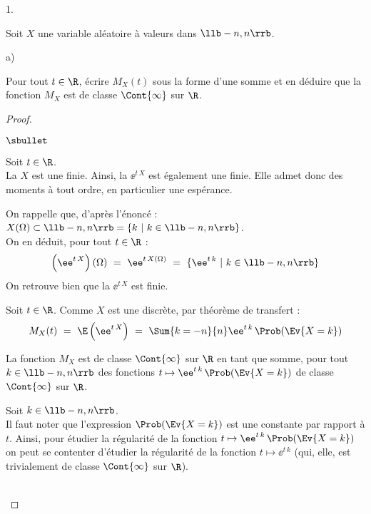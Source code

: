 \documentclass[11pt]{article}%
\begin{document}


\begin{noliste}{1.}
  \setlength{\itemsep}{4mm}
\item Soit $X$ une variable aléatoire à valeurs dans $\llb -n, n\rrb$.
  \begin{noliste}{a)}
    \setlength{\itemsep}{2mm}
  \item Pour tout $t\in \R$, écrire $M_X(t)$ sous la forme d'une somme
    et en déduire que la fonction $M_X$ est de classe $\Cont{\infty}$
    sur $\R$.
    \begin{proof}~
      \begin{noliste}{$\sbullet$}
      \item Soit $t \in \R$.\\
        La \var $X$ est une \var finie. Ainsi, la \var $\ee^{t \,
          X}$ est également une \var finie. Elle admet donc des
        moments à tout ordre, en particulier une espérance.
        \begin{remark}
          On rappelle que, d'après l'énoncé : $X(\Omega) \subset \llb
          -n, n \rrb = \{k \ | \ k \in \llb -n, n \rrb\}$.\\
          On en déduit, pour tout $t \in \R$ :
          \[
            \left(\ee^{t \, X}\right)(\Omega) \ = \ \ee^{t \,
              X(\Omega)} \ = \ \{\ee^{t \, k} \ | \ k \in \llb -n, n
            \rrb \}
          \]
          On retrouve bien que la \var $\ee^{t \, X}$ est finie.
        \end{remark}
        
      \item Soit $t\in \R$. Comme $X$ est une \var discrète, par
        théorème de transfert :
        \[
          M_X(t) \ = \ \E\left(\ee^{t \, X}\right) \ = \ \Sum{k=-n}{n}
          \ee^{t \, k} \, \Prob(\Ev{X = k})
        \]
        
      \item La fonction $M_X$ est de classe $\Cont{\infty}$ sur $\R$
        en tant que somme, pour tout $k \in \llb -n,n \rrb$ des
        fonctions $t \mapsto \ee^{t \, k} \, \Prob(\Ev{X=k})$ de
        classe $\Cont{\infty}$ sur $\R$.
      \end{noliste}
      \begin{remark}
        Soit $k \in \llb -n, n \rrb$.\\
        Il faut noter que l'expression $\Prob(\Ev{X = k})$ est une
        constante par rapport à $t$. Ainsi, pour étudier la régularité de
        la fonction $t \mapsto \ee^{t \, k} \, \Prob(\Ev{X = k})$
        on peut se contenter d'étudier la régularité de la fonction $t \mapsto
        \ee^{t \, k}$ (qui, elle, est trivialement de classe
        $\Cont{\infty}$ sur $\R$).
      \end{remark}~\\[-1.4cm]
    \end{proof}



\end{noliste}
\end{noliste}
\end{document}
